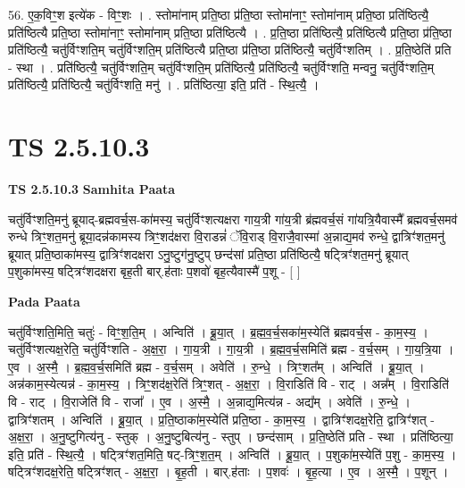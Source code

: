 \documentclass[17pt]{extarticle}
\begin{document}
56. ए॒क॒विꣳ॒॒श इत्ये॑क - विꣳ॒॒शः । . स्तोमा॑नाम् प्रति॒ष्ठा प्र॑ति॒ष्ठा स्तोमा॑नाꣳ॒॒ स्तोमा॑नाम् प्रति॒ष्ठा प्रति॑ष्ठित्यै॒ प्रति॑ष्ठित्यै प्रति॒ष्ठा स्तोमा॑नाꣳ॒॒ स्तोमा॑नाम् प्रति॒ष्ठा प्रति॑ष्ठित्यै । . प्र॒ति॒ष्ठा प्रति॑ष्ठित्यै॒ प्रति॑ष्ठित्यै प्रति॒ष्ठा प्र॑ति॒ष्ठा प्रति॑ष्ठित्यै॒ चतु॑र्विꣳशति॒म् चतु॑र्विꣳशति॒म् प्रति॑ष्ठित्यै प्रति॒ष्ठा प्र॑ति॒ष्ठा प्रति॑ष्ठित्यै॒ चतु॑र्विꣳशतिम् । . प्र॒ति॒ष्ठेति॑ प्रति - स्था । . प्रति॑ष्ठित्यै॒ चतु॑र्विꣳशति॒म् चतु॑र्विꣳशति॒म् प्रति॑ष्ठित्यै॒ प्रति॑ष्ठित्यै॒ चतु॑र्विꣳशति॒ मन्वनु॒ चतु॑र्विꣳशति॒म् प्रति॑ष्ठित्यै॒ प्रति॑ष्ठित्यै॒ चतु॑र्विꣳशति॒ मनु॑ । . प्रति॑ष्ठित्या॒ इति॒ प्रति॑ - स्थि॒त्यै॒ । \newline
\pagebreak
{}
\section*{ TS 2.5.10.3 }

\textbf{TS 2.5.10.3 } \newline
\textbf{Samhita Paata} \newline

चतु॑र्विꣳशति॒मनु॑ ब्रूयाद्-ब्रह्मवर्च॒स-का॑मस्य॒ चतु॑र्विꣳशत्यक्षरा गाय॒त्री गा॑य॒त्री ब्र॑ह्मवर्च॒सं गा॑यत्रि॒यैवास्मै᳚ ब्रह्मवर्च॒समव॑ रुन्धे त्रिꣳ॒॒शत॒मनु॑ ब्रूया॒दन्न॑कामस्य त्रिꣳ॒॒शद॑क्षरा वि॒राडन्नं॑ ॅवि॒राड् वि॒राजै॒वास्मा॑ अ॒न्नाद्य॒मव॑ रुन्धे॒ द्वात्रिꣳ॑शत॒मनु॑ ब्रूयात् प्रति॒ष्ठाका॑मस्य॒ द्वात्रिꣳ॑शदक्षरा ऽनु॒ष्टुग॑नु॒ष्टुप् छन्द॑सां प्रति॒ष्ठा प्रति॑ष्ठित्यै॒ षट्त्रिꣳ॑शत॒मनु॑ ब्रूयात् प॒शुका॑मस्य॒ षट्त्रिꣳ॑शदक्षरा बृह॒ती बार्.ह॑ताः प॒शवो॑ बृह॒त्यैवास्मै॑ प॒शू - [  ] \newline

\textbf{Pada Paata} \newline

चतु॑र्विꣳशति॒मिति॒ चतुः॑ - विꣳ॒॒श॒ति॒म् । अन्विति॑ । ब्रू॒या॒त् । ब्र॒ह्म॒व॒र्च॒सका॑म॒स्येति॑ ब्रह्मवर्च॒स - का॒म॒स्य॒ । चतु॑र्विꣳशत्यक्ष॒रेति॒ चतु॑र्विꣳशति - अ॒क्ष॒रा॒ । गा॒य॒त्री । गा॒य॒त्री । ब्र॒ह्म॒व॒र्च॒समिति॑ ब्रह्म - व॒र्च॒सम् । गा॒य॒त्रि॒या । ए॒व । अ॒स्मै॒ । ब्र॒ह्म॒व॒र्च॒समिति॑ ब्रह्म - व॒र्च॒सम् । अवेति॑ । रु॒न्धे॒ । त्रिꣳ॒॒शत᳚म् । अन्विति॑ । ब्रू॒या॒त् । अन्न॑काम॒स्येत्यन्न॑ - का॒म॒स्य॒ । त्रिꣳ॒॒शद॑क्ष॒रेति॑ त्रिꣳ॒॒शत् - अ॒क्ष॒रा॒ । वि॒राडिति॑ वि - राट् । अन्न᳚म् । वि॒राडिति॑ वि - राट् । वि॒राजेति॑ वि - राजा᳚ । ए॒व । अ॒स्मै॒ । अ॒न्नाद्य॒मित्य॑न्न - अद्य᳚म् । अवेति॑ । रु॒न्धे॒ । द्वात्रिꣳ॑शतम् । अन्विति॑ । ब्रू॒या॒त् । प्र॒ति॒ष्ठाका॑म॒स्येति॑ प्रति॒ष्ठा - का॒म॒स्य॒ । द्वात्रिꣳ॑शदक्ष॒रेति॒ द्वात्रिꣳ॑शत् - अ॒क्ष॒रा॒ । अ॒नु॒ष्टुगित्य॑नु - स्तुक् । अ॒नु॒ष्टुबित्य॑नु - स्तुप् । छन्द॑साम् । प्र॒ति॒ष्ठेति॑ प्रति - स्था । प्रति॑ष्ठित्या॒ इति॒ प्रति॑ - स्थि॒त्यै॒ । षट्त्रिꣳ॑शत॒मिति॒ षट्-त्रिꣳ॒॒श॒त॒म् । अन्विति॑ । ब्रू॒या॒त् । प॒शुका॑म॒स्येति॑ प॒शु - का॒म॒स्य॒ । षट्त्रिꣳ॑शदक्ष॒रेति॒ षट्त्रिꣳ॑शत् - अ॒क्ष॒रा॒ । बृ॒ह॒ती । बार्.ह॑ताः । प॒शवः॑ । बृ॒ह॒त्या । ए॒व । अ॒स्मै॒ । प॒शून् ।  \newline
\end{document}
